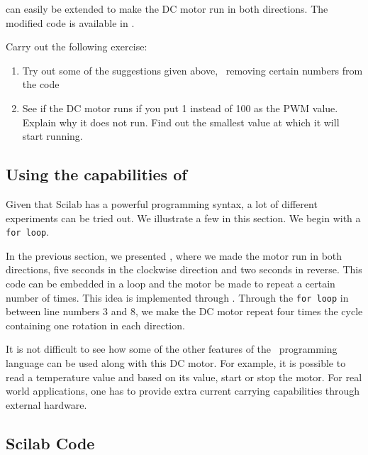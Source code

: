  can easily be extended to make the DC motor
run in both directions.  The modified code is available in
.

\begin{exercise}
Carry out the following exercise:
\begin{enumerate}
\item Try out some of the suggestions given above, \ie\ removing
  certain numbers from the code
\item See if the DC motor runs if you put 1 instead of 100 as the PWM
  value.  Explain why it does not run.  Find out the smallest value at
  which it will start running.
\end{enumerate}
\end{exercise}

\subsection{Using the capabilities of \scilab}
Given that Scilab has a powerful programming syntax, a lot of
different experiments can be tried out.  We illustrate a few in this
section.  We begin with a {\tt for loop}.

In the previous section, we presented , where
we made the motor run in both directions, five seconds in the
clockwise direction and two seconds in reverse.  This code can be
embedded in a loop and the motor be made to repeat a certain number of
times.  This idea is implemented through .
Through the {\tt for loop} in between line numbers 3 and 8, we make
the DC motor repeat four times the cycle containing one rotation in
each direction. 

It is not difficult to see how some of the other features of the
\scilab\ programming language can be used along with this DC motor.
For example, it is possible to read a temperature value and based on
its value, start or stop the motor.  For real world applications, one
has to provide extra current carrying capabilities through external
hardware.  

\subsection{Scilab Code}
\label{sec:dcmotor-scilab-code}


